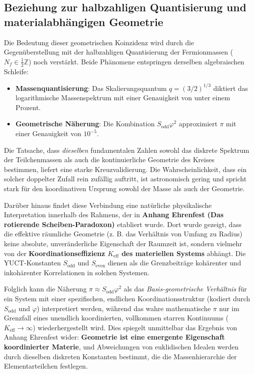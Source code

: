\documentclass[11pt,a4paper]{article}
\theoremstyle{remark}
\begin{document}
	\subsection{Beziehung zur halbzahligen Quantisierung und materialabhängigen Geometrie}
	
	Die Bedeutung dieser geometrischen Koinzidenz wird durch die Gegenüberstellung mit der halbzahligen Quantisierung der Fermionmassen (\(N_f \in \frac{1}{2}\mathbb{Z}\)) noch verstärkt. Beide Phänomene entspringen derselben algebraischen Schleife:
	\begin{itemize}
		\item \textbf{Massenquantisierung}: Das Skalierungsquantum \(q = (3/2)^{1/3}\) diktiert das logarithmische Massenspektrum mit einer Genauigkeit von unter einem Prozent.
		\item \textbf{Geometrische Näherung}: Die Kombination \(S_{\mathrm{odd}}\varphi^2\) approximiert \(\pi\) mit einer Genauigkeit von \(10^{-5}\).
	\end{itemize}
	Die Tatsache, dass \emph{dieselben} fundamentalen Zahlen sowohl das diskrete Spektrum der Teilchenmassen als auch die kontinuierliche Geometrie des Kreises bestimmen, liefert eine starke Kreuzvalidierung. Die Wahrscheinlichkeit, dass ein solcher doppelter Zufall rein zufällig auftritt, ist astronomisch gering und spricht stark für den koordinativen Ursprung sowohl der Masse als auch der Geometrie.
	
	Darüber hinaus findet diese Verbindung eine natürliche physikalische Interpretation innerhalb des Rahmens, der in \textbf{Anhang Ehrenfest (Das rotierende Scheiben-Paradoxon)} etabliert wurde. Dort wurde gezeigt, dass die effektive räumliche Geometrie (z. B. das Verhältnis von Umfang zu Radius) keine absolute, unveränderliche Eigenschaft der Raumzeit ist, sondern vielmehr von der \textbf{Koordinationseffizienz \(K_{\mathrm{eff}}\) des materiellen Systems} abhängt. Die YUCT-Konstanten \(S_{\mathrm{odd}}\) und \(S_{\mathrm{even}}\) dienen als die Grenzbeiträge kohärenter und inkohärenter Korrelationen in solchen Systemen. 
	
	Folglich kann die Näherung \(\pi \approx S_{\mathrm{odd}}\varphi^2\) als das \emph{Basis-geometrische Verhältnis} für ein System mit einer spezifischen, endlichen Koordinationsstruktur (kodiert durch \(S_{\mathrm{odd}}\) und \(\varphi\)) interpretiert werden, während das wahre mathematische \(\pi\) nur im Grenzfall eines unendlich koordinierten, vollkommen starren Kontinuums (\(K_{\mathrm{eff}} \to \infty\)) wiederhergestellt wird. Dies spiegelt unmittelbar das Ergebnis von Anhang Ehrenfest wider: \textbf{Geometrie ist eine emergente Eigenschaft koordinierter Materie}, und Abweichungen von euklidischen Idealen werden durch dieselben diskreten Konstanten bestimmt, die die Massenhierarchie der Elementarteilchen festlegen.
	
\end{document}
